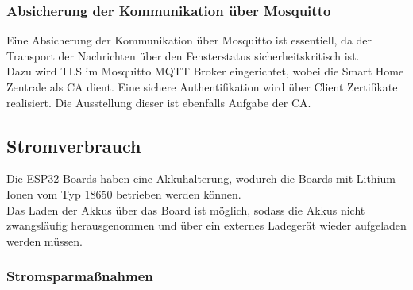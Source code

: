 \documentclass[a4paper,10pt,twocolumn]{article}
\begin{document}
\subsubsection{Absicherung der Kommunikation über Mosquitto}
Eine Absicherung der Kommunikation über Mosquitto ist essentiell, da der Transport der Nachrichten über den Fensterstatus sicherheitskritisch ist.\\
Dazu wird \ac{TLS} im Mosquitto \ac{MQTT} Broker eingerichtet, wobei die Smart Home Zentrale als \ac{CA} dient. Eine sichere Authentifikation wird über Client Zertifikate realisiert. Die Ausstellung dieser ist ebenfalls Aufgabe der \ac{CA}.

\subsection{Stromverbrauch}
Die ESP32 Boards haben eine Akkuhalterung, wodurch die Boards mit Lithium-Ionen vom Typ 18650 betrieben werden können.\\
Das Laden der Akkus über das Board ist möglich, sodass die Akkus nicht zwangsläufig herausgenommen und über ein externes Ladegerät wieder aufgeladen werden müssen.

\subsubsection{Stromsparmaßnahmen}\label{sec:stromsparmassnahmen} 
\end{document}
